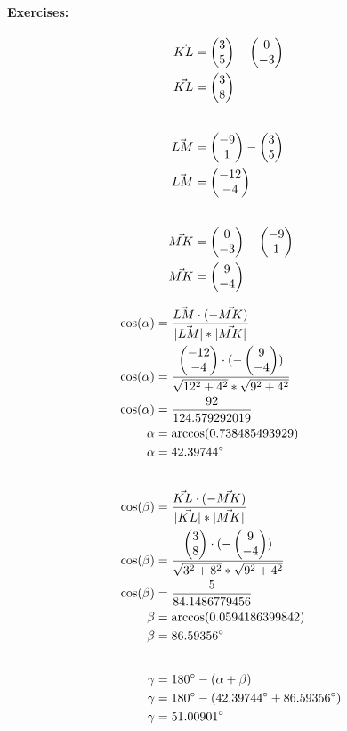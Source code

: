 \paragraph{Exercises:}
\begin{align}
   \vec{KL} &= \begin{pmatrix}
       3 \\ 
       5
   \end{pmatrix} - 
   \begin{pmatrix}
       0 \\ 
       -3
   \end{pmatrix} \\
   \vec{KL} &= \begin{pmatrix} 3 \\ 8 \end{pmatrix} \\[20pt]
   \vec{LM} &= \begin{pmatrix}
       -9 \\ 
       1
   \end{pmatrix} - 
   \begin{pmatrix}
       3 \\ 
       5
   \end{pmatrix} \\
   \vec{LM} &= \begin{pmatrix} -12 \\ -4 \end{pmatrix} \\[20pt]
   \vec{MK} &= \begin{pmatrix}
       0 \\ 
       -3
   \end{pmatrix} - 
   \begin{pmatrix}
       -9 \\ 
       1
   \end{pmatrix} \\
   \vec{MK} &= \begin{pmatrix} 9 \\ -4 \end{pmatrix}
\end{align}

\begin{align}
    \cos(\alpha) &= \frac{\vec{LM} \cdot (-\vec{MK})}{|\vec{LM}| * |\vec{MK}|} \\
   \cos(\alpha) &= \frac{\begin{pmatrix} -12 \\ -4 \end{pmatrix} \cdot (-\begin{pmatrix} 9 \\ -4 \end{pmatrix})}{\sqrt{12^2 + 4^2} * \sqrt{9^2 + 4^2}} \\
   \cos(\alpha) &= \frac{92}{124.579292019} \\
   \alpha &= \arccos(0.738485493929) \\
   \alpha &= 42.39744^\circ \\[20pt]
   \cos(\beta) &= \frac{\vec{KL} \cdot (-\vec{MK})}{|\vec{KL}| * |\vec{MK}|} \\
   \cos(\beta) &= \frac{\begin{pmatrix} 3 \\ 8 \end{pmatrix} \cdot (-\begin{pmatrix} 9 \\ -4 \end{pmatrix})}{\sqrt{3^2 + 8^2} * \sqrt{9^2 + 4^2}} \\
   \cos(\beta) &= \frac{5}{84.1486779456} \\
   \beta &= \arccos(0.0594186399842) \\
   \beta &= 86.59356^\circ \\[20pt]
   \gamma &= 180^\circ - (\alpha + \beta) \\
   \gamma &= 180^\circ - (42.39744^\circ + 86.59356^\circ) \\
   \gamma &= 51.00901^\circ 
\end{align}
